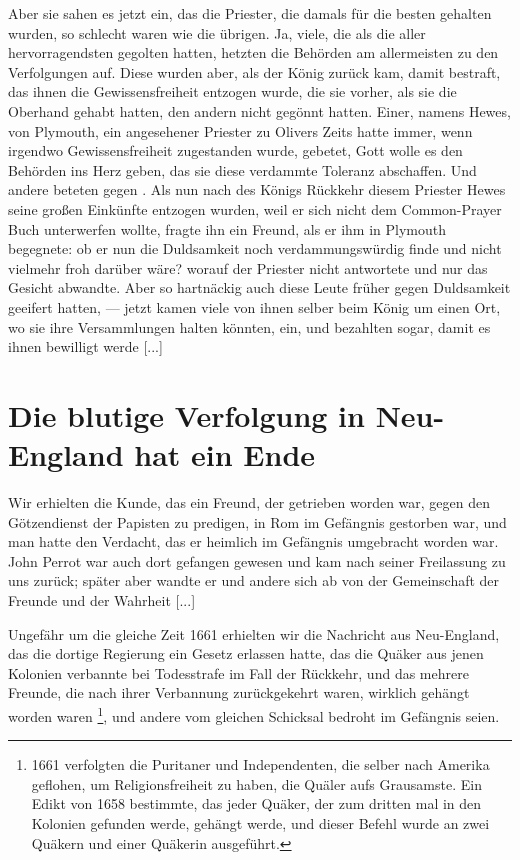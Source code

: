 Aber sie sahen es jetzt ein,
das die Priester, die damals für die besten gehalten wurden, so
schlecht waren wie die übrigen. Ja, viele, die als die aller 
hervorragendsten gegolten hatten, hetzten die Behörden am 
allermeisten zu den Verfolgungen auf. Diese wurden aber, als der
König zurück kam, damit bestraft, das ihnen die Gewissensfreiheit
entzogen wurde, die sie vorher, als sie die Oberhand gehabt hatten,
den andern nicht gegönnt hatten. Einer, namens Hewes, von
Plymouth, ein angesehener Priester 
zu Olivers Zeits hatte immer,
wenn irgendwo Gewissensfreiheit zugestanden wurde, gebetet, Gott
wolle es den Behörden ins Herz geben, das sie diese verdammte
Toleranz abschaffen.   
Und andere beteten gegen . Als nun nach des Königs Rückkehr
diesem Priester Hewes seine großen Einkünfte entzogen wurden,
weil er sich nicht dem Common-Prayer Buch unterwerfen wollte,
fragte ihn ein Freund, als er ihm in Plymouth begegnete: ob er
nun die Duldsamkeit noch verdammungswürdig finde und nicht
vielmehr froh darüber wäre? worauf der Priester nicht antwortete
und nur das Gesicht abwandte. Aber so hartnäckig auch diese
Leute früher gegen Duldsamkeit geeifert hatten, — jetzt kamen
viele von ihnen selber beim König um einen Ort, wo sie ihre
Versammlungen halten könnten, ein, und bezahlten sogar, damit
es ihnen bewilligt werde [...]

\section{Die blutige Verfolgung in Neu-England hat ein Ende}

Wir erhielten die Kunde, das ein Freund, der getrieben worden
war, gegen den Götzendienst der Papisten 
zu predigen, in Rom
im Gefängnis gestorben war, und man hatte den Verdacht, das
er heimlich im Gefängnis umgebracht worden war. 
John Perrot 
war auch dort gefangen gewesen und kam nach seiner Freilassung
zu uns zurück; später aber wandte er und andere sich ab von
der Gemeinschaft der Freunde und der Wahrheit [...]

Ungefähr um die gleiche Zeit 1661 erhielten 
wir die Nachricht 
aus Neu-England, das die dortige Regierung ein Gesetz
erlassen hatte, das die Quäker aus jenen Kolonien verbannte bei
Todesstrafe im Fall der Rückkehr, und das mehrere Freunde, die
nach ihrer Verbannung zurückgekehrt waren, wirklich gehängt
worden waren \footnote{1661 verfolgten die 
Puritaner und 
Independenten, die selber nach Amerika geflohen, um 
Religionsfreiheit zu haben, die Quäler aufs Grausamste.
Ein Edikt von 1658 bestimmte, das jeder 
Quäker, der zum dritten 
mal in den Kolonien gefunden werde, gehängt werde, und 
dieser Befehl wurde an zwei Quäkern und einer Quäkerin 
ausgeführt.}, und andere vom gleichen Schicksal bedroht im
Gefängnis seien. 

